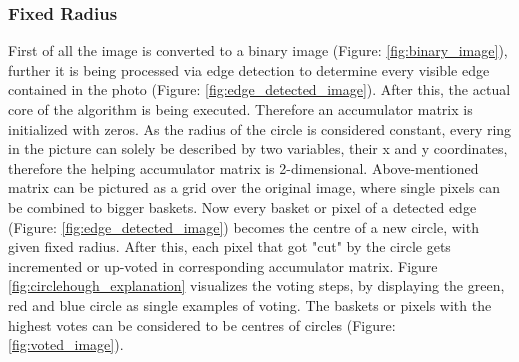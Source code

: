 \subsubsection{Fixed Radius}
First of all the image is converted to a binary image  (Figure: \ref{fig:binary_image}), further it is being processed via edge detection to determine every visible edge contained in the photo (Figure: \ref{fig:edge_detected_image}).
After this, the actual core of the algorithm is being executed. Therefore an accumulator matrix is initialized with zeros. As the radius of the circle is considered constant, every ring in the picture can solely be described by two variables, their x and y coordinates, therefore the helping accumulator matrix is 2-dimensional.
Above-mentioned matrix can be pictured as a grid over the original image, where single pixels can be combined to bigger baskets. Now every basket or pixel of a detected edge (Figure: \ref{fig:edge_detected_image}) becomes the centre of a new circle, with given fixed radius. After this, each pixel that got "cut" by the circle gets incremented or up-voted in corresponding accumulator matrix. Figure \ref{fig:circlehough_explanation} visualizes the voting steps, by displaying the green, red and blue circle as single examples of voting. The baskets or pixels with the highest votes can be considered to be centres of circles (Figure: \ref{fig:voted_image}).
\newline

